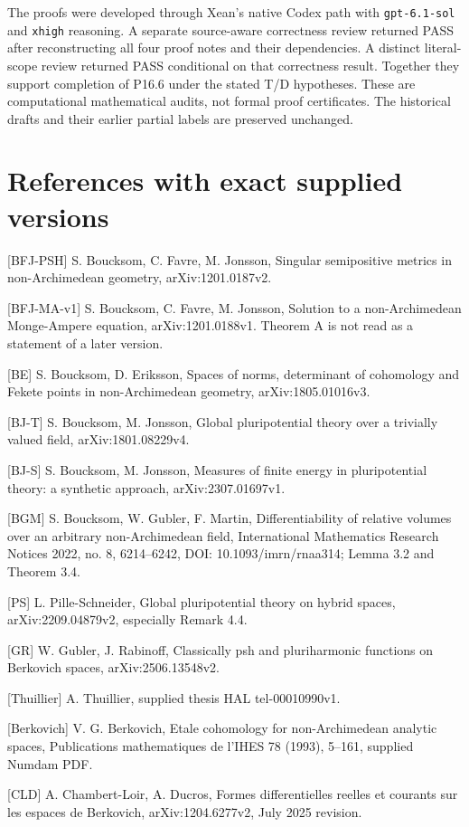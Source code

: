 \documentclass[11pt]{article}
\begin{document}
The proofs were developed through Xean's native Codex path with
\texttt{gpt-6.1-sol} and \texttt{xhigh} reasoning. A separate
source-aware correctness review returned PASS after reconstructing all
four proof notes and their dependencies. A distinct literal-scope
review returned PASS conditional on that correctness result. Together
they support completion of P16.6 under the stated T/D hypotheses.
These are computational mathematical audits, not formal proof
certificates. The historical drafts and their earlier partial labels
are preserved unchanged.

\section*{References with exact supplied versions}

[BFJ-PSH] S. Boucksom, C. Favre, M. Jonsson, Singular semipositive metrics in non-Archimedean geometry, arXiv:1201.0187v2.

[BFJ-MA-v1] S. Boucksom, C. Favre, M. Jonsson, Solution to a non-Archimedean Monge-Ampere equation, arXiv:1201.0188v1. Theorem A is not read as a statement of a later version.

[BE] S. Boucksom, D. Eriksson, Spaces of norms, determinant of cohomology and Fekete points in non-Archimedean geometry, arXiv:1805.01016v3.

[BJ-T] S. Boucksom, M. Jonsson, Global pluripotential theory over a trivially valued field, arXiv:1801.08229v4.

[BJ-S] S. Boucksom, M. Jonsson, Measures of finite energy in pluripotential theory: a synthetic approach, arXiv:2307.01697v1.

[BGM] S. Boucksom, W. Gubler, F. Martin, Differentiability of relative volumes over an arbitrary non-Archimedean field, International Mathematics Research Notices 2022, no. 8, 6214--6242, DOI: 10.1093/imrn/rnaa314; Lemma 3.2 and Theorem 3.4.

[PS] L. Pille-Schneider, Global pluripotential theory on hybrid spaces, arXiv:2209.04879v2, especially Remark 4.4.

[GR] W. Gubler, J. Rabinoff, Classically psh and pluriharmonic functions on Berkovich spaces, arXiv:2506.13548v2.

[Thuillier] A. Thuillier, supplied thesis HAL tel-00010990v1.

[Berkovich] V. G. Berkovich, Etale cohomology for non-Archimedean analytic spaces, Publications mathematiques de l'IHES 78 (1993), 5--161, supplied Numdam PDF.

[CLD] A. Chambert-Loir, A. Ducros, Formes differentielles reelles et courants sur les espaces de Berkovich, arXiv:1204.6277v2, July 2025 revision.
\end{document}
